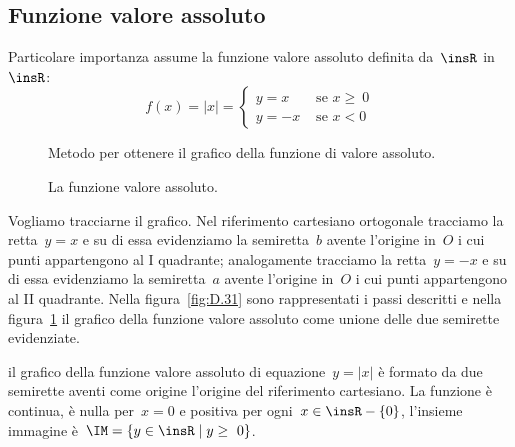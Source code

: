 \vspazio\ovalbox{\risolvi \ref{ese:D.61}}

\subsection{Funzione valore assoluto}
Particolare importanza assume la funzione valore assoluto definita da~$\insR$ in~$\insR$:
\[
f(x)=|x|=
\begin{cases}
y=x & \text{ se }x\ge~0\\
y=-x & \text{ se }x<0
\end{cases}
\]


\begin{figure}[htb]
\begin{minipage}[t]{.45\textwidth}
\centering
\caption{Metodo per ottenere il grafico della funzione di valore assoluto.}\label{fig:D.31}
\end{minipage}\hfil
\begin{minipage}[t]{.45\textwidth}
\centering
\caption{La funzione valore assoluto.}\label{fig:D.32}
\end{minipage}
\end{figure}

Vogliamo tracciarne il grafico. Nel riferimento cartesiano ortogonale tracciamo la retta~$y=x$ e su di essa evidenziamo
la semiretta~$b$ avente l'origine in~$O$ i cui punti appartengono al I quadrante; analogamente tracciamo la retta~$y=-x$
e su di essa evidenziamo la semiretta~$a$ avente l'origine in~$O$ i cui punti appartengono al II quadrante.
Nella figura~\ref{fig:D.31} sono rappresentati i passi descritti e nella figura~\ref{fig:D.32} il grafico della funzione valore assoluto come unione delle due semirette evidenziate.

\conclusione il grafico della funzione valore assoluto di equazione~$y=|x|$ è formato da due semirette aventi come origine
l'origine del riferimento cartesiano. La funzione è continua, è nulla per~$x=0$ e positiva per ogni~$x\in \insR-\{0\}$,
l'insieme immagine è~$\IM=\{y\in \insR\mid  y\ge~0\}$.

\vspazio\ovalbox{\risolvii \ref{ese:D.62}, \ref{ese:D.63}, \ref{ese:D.64}}

\newpage

\cleardoublepage
